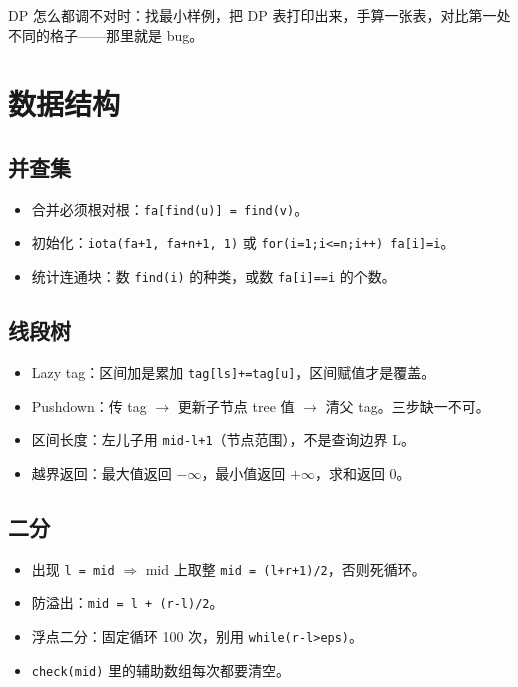 \documentclass[UTF8,openany,oneside,zihao=-4]{ctexbook}
\begin{document}
\begin{tip}
DP 怎么都调不对时：找最小样例，把 DP 表打印出来，手算一张表，对比第一处不同的格子——那里就是 bug。
\end{tip}

\chapter{数据结构}

\section{并查集}

\begin{itemize}
  \item 合并必须根对根：\lstinline|fa[find(u)] = find(v)|。
  \item 初始化：\lstinline|iota(fa+1, fa+n+1, 1)| 或 \lstinline|for(i=1;i<=n;i++) fa[i]=i|。
  \item 统计连通块：数 \lstinline|find(i)| 的种类，或数 \lstinline|fa[i]==i| 的个数。
\end{itemize}

\section{线段树}

\begin{itemize}
  \item Lazy tag：区间加是累加 \lstinline|tag[ls]+=tag[u]|，区间赋值才是覆盖。
  \item Pushdown：传 tag $\to$ 更新子节点 tree 值 $\to$ 清父 tag。三步缺一不可。
  \item 区间长度：左儿子用 \lstinline|mid-l+1|（节点范围），不是查询边界 L。
  \item 越界返回：最大值返回 $-\infty$，最小值返回 $+\infty$，求和返回 0。
\end{itemize}

\section{二分}

\begin{itemize}
  \item 出现 \lstinline|l = mid| $\Rightarrow$ mid 上取整 \lstinline|mid = (l+r+1)/2|，否则死循环。
  \item 防溢出：\lstinline|mid = l + (r-l)/2|。
  \item 浮点二分：固定循环 100 次，别用 \lstinline|while(r-l>eps)|。
  \item \lstinline|check(mid)| 里的辅助数组每次都要清空。
\end{itemize}
\end{document}
